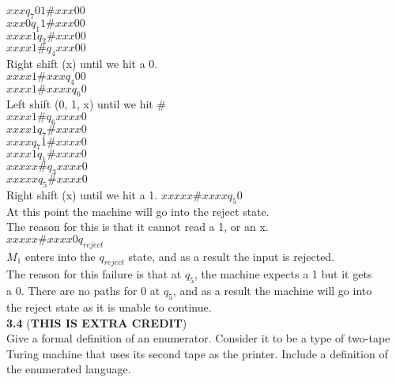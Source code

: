 \documentclass[12pt]{article}
\begin{document}
$xxx                q_7    01 \# xxx00$ \\
$xxx0               q_1     1 \# xxx00$ \\
$xxxx1              q_2       \# xxx00$ \\
$xxxx1 \#           q_4          xxx00$ \\
Right shift (x) until we hit a 0.       \\
$xxxx1 \# xxx       q_4             00$ \\
$xxxx1 \# xxxx      q_6              0$ \\
Left shift (0, 1, x) until we hit  $\#$ \\
$xxxx1 \#           q_6          xxxx0$ \\
$xxxx1              q_7      \#  xxxx0$ \\
$xxxx               q_7    1 \#  xxxx0$ \\
$xxxx1              q_1      \#  xxxx0$ \\
$xxxxx  \#          q_3          xxxx0$ \\
$xxxxx              q_5      \#  xxxx0$ \\
Right shift (x) until we hit a 1.
$xxxxx \#  xxxx     q_5              0$ \\
At this point the machine will go into the reject state. \\
The reason for this is that it cannot read a 1, or an x. \\
$xxxxx \#  xxxx0    q_{reject}        $ \\
$M_1$ enters into the $q_{reject}$ state, and as a result the input is rejected. \\

The reason for this failure is that at $q_5$, the machine expects a 1 but it gets \\
a 0. There are no paths for 0 at $q_5$, and as a result the machine will go into \\
the reject state as it is unable to continue. \\


\pagebreak
\textbf{3.4} (\textbf{THIS IS EXTRA CREDIT}) \\
Give a formal definition of an enumerator. Consider it to be a type of two-tape
Turing machine that uses its second tape as the printer. Include a definition
of the enumerated language. \\
\end{document}
